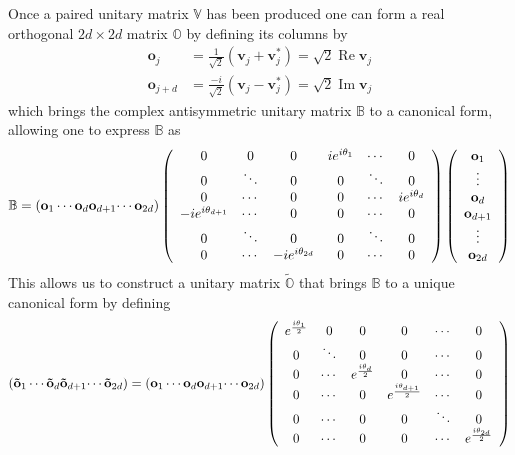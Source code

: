 \documentclass[aps,preprint]{revtex4}%
\begin{document}
Once a paired unitary matrix $\mathbb{V}$ has been produced one can form a
real orthogonal $2d\times2d$ matrix $\mathbb{O}$ by defining its columns by
\begin{align}
\mathbf{o}_{j} &  =\frac{1}{\sqrt{2}}\left(  \mathbf{v}_{j}+\mathbf{v}%
_{j}^{\ast}\right)  =\sqrt{2}\operatorname{Re}\mathbf{v}_{j}\nonumber\\
\mathbf{o}_{j+d} &  =\frac{-i}{\sqrt{2}}\left(  \mathbf{v}_{j}-\mathbf{v}%
_{j}^{\ast}\right)  =\sqrt{2}\operatorname{Im}\mathbf{v}_{j}%
\end{align}
which brings the complex antisymmetric unitary matrix $\mathbb{B}$ to a
canonical form, allowing one to express $\mathbb{B}$ as
\begin{equation}
\mathbb{B}=\left(  \mathbf{o}_{1}\cdots\mathbf{o}_{d}\mathbf{o}_{d+1}%
\mathbf{\cdots o}_{2d}\right)  \left(
\begin{array}
[c]{cccccc}%
0 & 0 & 0 & ie^{i\theta_{1}} & \cdots & 0\\
0 & \ddots & 0 & 0 & \ddots & 0\\
0 & \cdots & 0 & 0 & \cdots & ie^{i\theta_{d}}\\
-ie^{i\theta_{d+1}} & \cdots & 0 & 0 & \cdots & 0\\
0 & \ddots & 0 & 0 & \ddots & 0\\
0 & \cdots & -ie^{i\theta_{2d}} & 0 & \cdots & 0
\end{array}
\right)  \left(
\begin{array}
[c]{c}%
\mathbf{o}_{1}\\
\vdots\\
\mathbf{o}_{d}\\
\mathbf{o}_{d+1}\\
\vdots\\
\mathbf{o}_{2d}%
\end{array}
\right)  \label{reex1}%
\end{equation}
This allows us to construct a unitary matrix $\widetilde{\mathbb{O}}$ that
brings $\mathbb{B}$ to a unique canonical form by defining
\begin{equation}
\left(  \mathbf{\tilde{o}}_{1}\cdots\mathbf{\tilde{o}}_{d}\mathbf{\tilde{o}%
}_{d+1}\mathbf{\cdots\tilde{o}}_{2d}\right)  =\left(  \mathbf{o}_{1}%
\cdots\mathbf{o}_{d}\mathbf{o}_{d+1}\mathbf{\cdots o}_{2d}\right)  \left(
\begin{array}
[c]{cccccc}%
e^{\frac{i\theta_{1}}{2}} & 0 & 0 & 0 & \cdots & 0\\
0 & \ddots & 0 & 0 & \cdots & 0\\
0 & \cdots & e^{\frac{i\theta_{d}}{2}} & 0 & \cdots & 0\\
0 & \cdots & 0 & e^{\frac{i\theta_{d+1}}{2}} & \cdots & 0\\
0 & \cdots & 0 & 0 & \ddots & 0\\
0 & \cdots & 0 & 0 & \cdots & e^{\frac{i\theta_{2d}}{2}}%
\end{array}
\right)
\end{equation}
\end{document}
